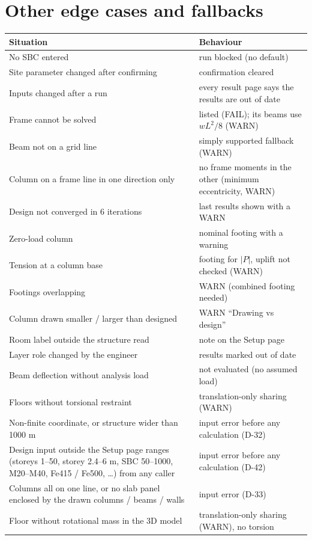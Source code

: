 \documentclass[10pt,a4paper]{article}
\begin{document}
\section{Other edge cases and fallbacks}\label{sec:edge}
\begin{longtable}{L{56mm}L{108mm}}
\toprule \textbf{Situation} & \textbf{Behaviour} \\ \midrule \endhead
No SBC entered & run blocked (no default) \\
Site parameter changed after confirming & confirmation cleared \\
Inputs changed after a run & every result page says the results are out of date \\
Frame cannot be solved & listed (FAIL); its beams use $wL^2/8$ (WARN) \\
Beam not on a grid line & simply supported fallback (WARN) \\
Column on a frame line in one direction only & no frame moments in the other (minimum eccentricity, WARN) \\
Design not converged in 6 iterations & last results shown with a WARN \\
Zero-load column & nominal footing with a warning \\
Tension at a column base & footing for $|P|$, uplift not checked (WARN) \\
Footings overlapping & WARN (combined footing needed) \\
Column drawn smaller / larger than designed & WARN ``Drawing vs design'' \\
Room label outside the structure read & note on the Setup page \\
Layer role changed by the engineer & results marked out of date \\
Beam deflection without analysis load & not evaluated (no assumed load) \\
Floors without torsional restraint & translation-only sharing (WARN) \\
Non-finite coordinate, or structure wider than 1000 m & input error before any calculation (D-32) \\
Design input outside the Setup page ranges (storeys 1--50, storey 2.4--6 m, SBC 50--1000, M20--M40, Fe415 / Fe500,
\dots) from any caller & input error before any calculation (D-42) \\
Columns all on one line, or no slab panel enclosed by the drawn columns / beams / walls & input error (D-33) \\
Floor without rotational mass in the 3D model & translation-only sharing (WARN), no torsion \\

\end{longtable}
\end{document}

